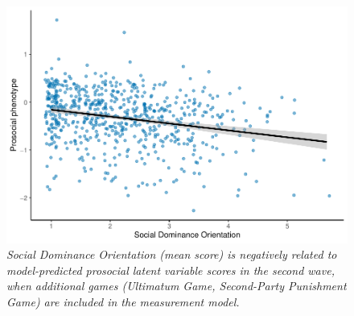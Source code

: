 \documentclass[
  man,floatsintext]{apa6}
\begin{document}
\newpage






\begin{figure}
\includegraphics[width=0.8\linewidth]{manuscript_files/figure-latex/semPlotFull-1} \caption{\emph{Social Dominance Orientation (mean score) is
negatively related to model-predicted prosocial latent variable scores in the
second wave, when additional games (Ultimatum Game, Second-Party Punishment
Game) are included in the measurement model.}}\label{fig:semPlotFull}
\end{figure}

\newpage
\end{document}
